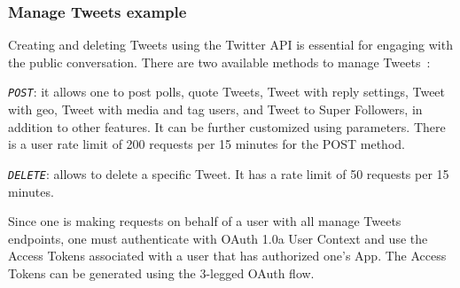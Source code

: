 \subsubsection{Manage Tweets example}
\label{sec:manage-tweets-exampl}
Creating and deleting Tweets using the Twitter API is essential for engaging
with the public conversation. There are two available methods to manage Tweets~\cite{twitterManageTweetIntro}:
\begin{enum-c}
\item \emph{\texttt{POST}}: it allows one to post polls, quote Tweets, Tweet
  with reply settings, Tweet with geo, Tweet with media and tag users, and Tweet to Super Followers, in addition to other
  features. It can be further customized using parameters.
There is a user rate limit of 200 requests per 15 minutes for the POST
method.
\item \emph{\texttt{DELETE}}: allows to delete a specific Tweet.
It has a rate limit of 50 requests per 15 minutes.
\end{enum-c}

Since one is making requests on behalf of a user with all manage Tweets
endpoints, one must authenticate with OAuth 1.0a User Context and use the Access
Tokens associated with a user that has authorized one's App. The Access Tokens
can be generated using the 3-legged OAuth flow.


